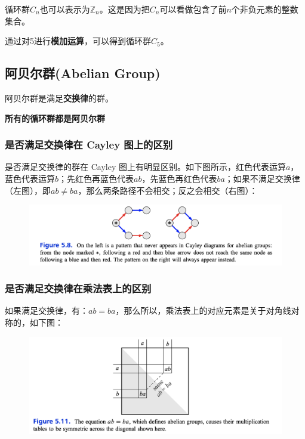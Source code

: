 \documentclass[12pt]{article}
\begin{document}
循环群$C_n$也可以表示为$\mathbb{Z}_n$。这是因为把$C_n$可以看做包含了前$n$个非负元素的整数集合。

通过对5进行\textbf{模加运算}，可以得到循环群$C_5$。

\subsection{阿贝尔群(Abelian Group)}
阿贝尔群是满足\textbf{交换律}的群。

\textbf{所有的循环群都是阿贝尔群}

\subsubsection{是否满足交换律在 Cayley 图上的区别}
是否满足交换律的群在 Cayley 图上有明显区别。如下图所示，红色代表运算$a$，蓝色代表运算$b$；先红色再蓝色代表$ab$，先蓝色再红色代表$ba$；如果不满足交换律（左图），即$ab\neq ba$，那么两条路径不会相交；反之会相交（右图）：
\begin{figure}[H]
    \centering
    \includegraphics[width=1\textwidth]{fig/Group/Cayley-Noncommutativity.png}
\end{figure}

\subsubsection{是否满足交换律在乘法表上的区别}
如果满足交换律，有：$ab=ba$，那么所以，乘法表上的对应元素是关于对角线对称的，如下图：
\begin{figure}[H]
    \centering
    \includegraphics[width=1\textwidth]{fig/Group/MultiplicationTable-Commutativity.png}
\end{figure}
\end{document}
